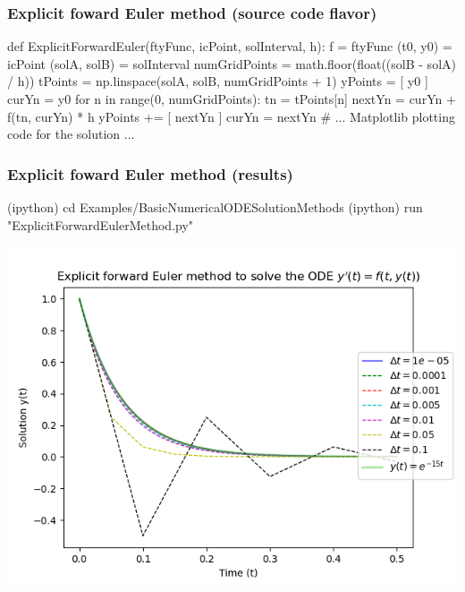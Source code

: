 \documentclass[usenames,svgnames,dvipsnames,10pt]{beamer}
\begin{document}
\begin{frame}[fragile]
\frametitle{Explicit foward Euler method (source code flavor)}

\begin{center}
\begin{pythoncode}
def ExplicitForwardEuler(ftyFunc, icPoint, solInterval, h):
    f = ftyFunc
    (t0, y0) = icPoint
    (solA, solB) = solInterval
    numGridPoints = math.floor(float((solB - solA) / h))
    tPoints = np.linspace(solA, solB, numGridPoints + 1)
    yPoints = [ y0 ]
    curYn = y0
    for n in range(0, numGridPoints):
        tn = tPoints[n]
        nextYn = curYn + f(tn, curYn) * h
        yPoints += [ nextYn ]
        curYn = nextYn
    # ... Matplotlib plotting code for the solution ... 
\end{pythoncode}
\end{center}

\end{frame}

\begin{frame}[fragile]
\frametitle{Explicit foward Euler method (results)}

\begin{center}
\begin{code}
(ipython) cd Examples/BasicNumericalODESolutionMethods
(ipython) run "ExplicitForwardEulerMethod.py"
\end{code}
\vskip -0.075cm
\includegraphics[height=0.76\textheight]{../Images/ExplicitForwardEuler-PlotOutput-StepSizeHComparison-v2.png}
\end{center}

\end{frame}
\end{document}

